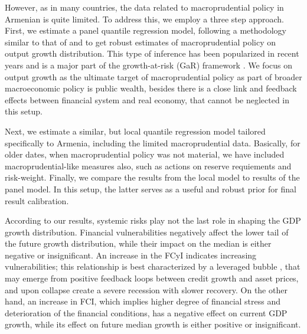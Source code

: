 However, as in many countries, the data related to macroprudential policy in Armenian is quite limited. To address this, we employ a three step approach. First, we estimate a panel quantile regression model, following a methodology similar to that of \citet{galan2020} and \citet{aikman2019} to get robust estimates of macroprudential policy on output growth distribution. This type of inference has been popularized in recent years and is a major part of the growth-at-risk (GaR) framework \citep{esrb2024}. We focus on output growth as the ultimate target of macroprudential policy as part of broader macroeconomic policy is public wealth, besides there is a close link and feedback effects between financial system and real economy, that cannot be neglected in this setup.

Next, we estimate a similar, but local quantile regression model tailored specifically to Armenia, including the limited macroprudential data. Basically, for older dates, when macroprudential policy was not material, we have included macroprudential-like measures also, such as actions on reserve requiements and risk-weight. Finally, we compare the results from the local model  to results of the panel model. In this setup, the latter serves as a useful and robust prior for final result calibration.

According to our results, systemic risks play not the last role in shaping the GDP growth distribution. Financial vulnerabilities negatively affect the lower tail of the future growth distribution, while their impact on the median is either negative or insignificant. An increase in the FCyI indicates increasing vulnerabilities; this relationship is best characterized by a leveraged bubble \citep{jorda2015}, that may emerge from positive feedback loops between credit growth and asset prices, and upon collapse create a severe recession with slower recovery. On the other hand, an increase in FCI, which implies higher degree of financial stress and deterioration of the financial conditions, has a negative effect on current GDP growth, while its effect on future median growth is either positive or insignificant.

